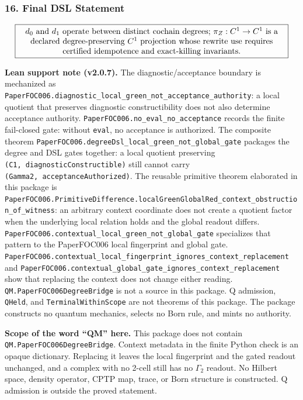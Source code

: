 \documentclass[
]{article}
\renewenvironment{quote}
  {\begin{leftbar}\small}
  {\end{leftbar}}
\begin{document}
\subsubsection{16. Final DSL Statement}\label{final-dsl-statement}

\[
\fbox{\parbox{0.95\textwidth}{\centering $d_0$ and $d_1$ operate between distinct cochain degrees; $\pi_Z : C^1 \to C^1$ is a declared degree-preserving $C^1$ projection whose rewrite use requires certified idempotence and exact-killing invariants.}}
\]

\textbf{Lean support note (v2.0.7).} The diagnostic/acceptance boundary is mechanized as \texttt{PaperFOC006.diagnostic\_local\_green\_not\_acceptance\_authority}: a local quotient that preserves diagnostic constructibility does not also determine acceptance authority. \texttt{PaperFOC006.no\_eval\_no\_acceptance} records the finite fail-closed gate: without \texttt{eval}, no acceptance is authorized. The composite theorem \texttt{PaperFOC006.degreeDsl\_local\_green\_not\_global\_gate} packages the degree and DSL gates together: a local quotient preserving \texttt{(C1,\ diagnosticConstructible)} still cannot carry \texttt{(Gamma2,\ acceptanceAuthorized)}. The reusable primitive theorem elaborated in this package is \texttt{PaperFOC006.PrimitiveDifference.localGreenGlobalRed\_context\_obstruction\_of\_witness}: an arbitrary context coordinate does not create a quotient factor when the underlying local relation holds and the global readout differs. \texttt{PaperFOC006.contextual\_local\_green\_not\_global\_gate} specializes that pattern to the PaperFOC006 local fingerprint and global gate. \texttt{PaperFOC006.contextual\_local\_fingerprint\_ignores\_context\_replacement} and \texttt{PaperFOC006.contextual\_global\_gate\_ignores\_context\_replacement} show that replacing the context does not change either reading. \texttt{QM.PaperFOC006DegreeBridge} is not a source in this package. Q admission, \texttt{QHeld}, and \texttt{TerminalWithinScope} are not theorems of this package. The package constructs no quantum mechanics, selects no Born rule, and mints no authority.

\begin{quote}
\textbf{Scope of the word ``QM'' here.} This package does not contain \texttt{QM.PaperFOC006DegreeBridge}. Context metadata in the finite Python check is an opaque dictionary. Replacing it leaves the local fingerprint and the gated readout unchanged, and a complex with no 2-cell still has no \(\Gamma_2\) readout. No Hilbert space, density operator, CPTP map, trace, or Born structure is constructed. Q admission is outside the proved statement.
\end{quote}
\end{document}
